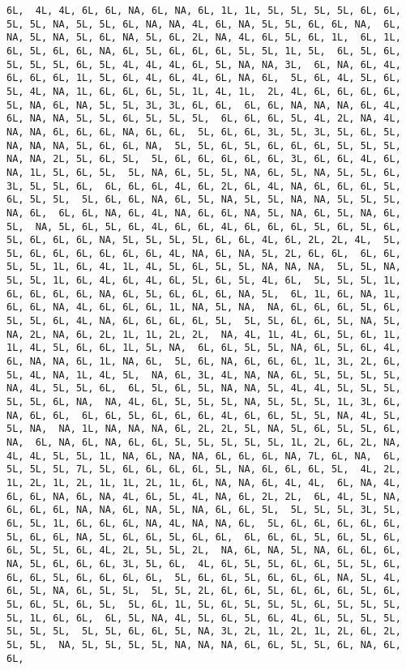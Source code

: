 \documentclass[
]{article}
\begin{document}
\begin{verbatim}
6L,  4L, 4L, 6L, 6L, NA, 6L, NA, 6L, 1L, 1L, 5L, 5L, 5L, 5L, 6L, 6L,  5L, 5L, NA, 5L, 5L, 6L, NA, NA, 4L, 6L, NA, 5L, 5L, 6L, 6L, NA,  6L, NA, 5L, NA, 5L, 6L, NA, 5L, 6L, 2L, NA, 4L, 6L, 5L, 6L, 1L,  6L, 1L, 6L, 5L, 6L, 6L, NA, 6L, 5L, 6L, 6L, 6L, 5L, 5L, 1L, 5L,  6L, 5L, 6L, 5L, 5L, 5L, 6L, 5L, 4L, 4L, 4L, 6L, 5L, NA, NA, 3L,  6L, NA, 6L, 4L, 6L, 6L, 6L, 1L, 5L, 6L, 4L, 6L, 4L, 6L, NA, 6L,  5L, 6L, 4L, 5L, 6L, 5L, 4L, NA, 1L, 6L, 6L, 6L, 5L, 1L, 4L, 1L,  2L, 4L, 6L, 6L, 6L, 6L, 5L, NA, 6L, NA, 5L, 5L, 3L, 3L, 6L, 6L,  6L, 6L, NA, NA, NA, 6L, 4L, 6L, NA, NA, 5L, 5L, 6L, 5L, 5L, 5L,  6L, 6L, 6L, 5L, 4L, 2L, NA, 4L, NA, NA, 6L, 6L, 6L, NA, 6L, 6L,  5L, 6L, 6L, 3L, 5L, 3L, 5L, 6L, 5L, NA, NA, NA, 5L, 6L, 6L, NA,  5L, 5L, 6L, 5L, 6L, 6L, 6L, 5L, 5L, 5L, NA, NA, 2L, 5L, 6L, 5L,  5L, 6L, 6L, 6L, 6L, 6L, 3L, 6L, 6L, 4L, 6L, NA, 1L, 5L, 6L, 5L,  5L, NA, 6L, 5L, 5L, NA, 6L, 5L, NA, 5L, 5L, 6L, 3L, 5L, 5L, 6L,  6L, 6L, 6L, 4L, 6L, 2L, 6L, 4L, NA, 6L, 6L, 6L, 5L, 6L, 5L, 5L,  5L, 6L, 6L, NA, 6L, 5L, NA, 5L, 5L, NA, NA, 5L, 5L, 5L, NA, 6L,  6L, 6L, NA, 6L, 4L, NA, 6L, 6L, NA, 5L, NA, 6L, 5L, NA, 6L, 5L,  NA, 5L, 6L, 5L, 6L, 4L, 6L, 6L, 4L, 6L, 6L, 6L, 5L, 6L, 5L, 6L,  5L, 6L, 6L, 6L, NA, 5L, 5L, 5L, 5L, 6L, 6L, 4L, 6L, 2L, 2L, 4L,  5L, 5L, 6L, 6L, 6L, 6L, 6L, 6L, 4L, NA, 6L, NA, 5L, 2L, 6L, 6L,  6L, 6L, 5L, 5L, 1L, 6L, 4L, 1L, 4L, 5L, 6L, 5L, 5L, NA, NA, NA,  5L, 5L, NA, 5L, 5L, 1L, 6L, 4L, 6L, 4L, 6L, 5L, 6L, 5L, 4L, 6L,  5L, 5L, 5L, 1L, 6L, 6L, 6L, 6L, NA, 6L, 5L, 6L, 6L, 6L, NA, 5L,  6L, 1L, 6L, NA, 1L, 6L, 6L, NA, 4L, 6L, 6L, 6L, 1L, NA, 5L, NA,  NA, 6L, 6L, 6L, 5L, 6L, 5L, 5L, 6L, 4L, NA, 6L, 6L, 6L, 6L, 5L,  5L, 5L, 6L, 6L, 5L, NA, 5L, NA, 2L, NA, 6L, 2L, 1L, 1L, 2L, 2L,  NA, 4L, 1L, 4L, 6L, 5L, 6L, 1L, 1L, 4L, 5L, 6L, 6L, 1L, 5L, NA,  6L, 6L, 5L, 5L, NA, 6L, 5L, 6L, 4L, 6L, NA, NA, 6L, 1L, NA, 6L,  5L, 6L, NA, 6L, 6L, 6L, 1L, 3L, 2L, 6L, 5L, 4L, NA, 1L, 4L, 5L,  NA, 6L, 3L, 4L, NA, NA, 6L, 5L, 5L, 5L, 5L, NA, 4L, 5L, 5L, 6L,  6L, 5L, 6L, 5L, NA, NA, 5L, 4L, 4L, 5L, 5L, 5L, 5L, 5L, 6L, NA,  NA, 4L, 6L, 5L, 5L, 5L, NA, 5L, 5L, 5L, 1L, 3L, 6L, NA, 6L, 6L,  6L, 6L, 5L, 6L, 6L, 6L, 4L, 6L, 6L, 5L, 5L, NA, 4L, 5L, 5L, NA,  NA, 1L, NA, NA, NA, 6L, 2L, 2L, 5L, NA, 5L, 6L, 5L, 5L, 6L, NA,  6L, NA, 6L, NA, 6L, 6L, 5L, 5L, 5L, 5L, 5L, 1L, 2L, 6L, 2L, NA,  4L, 4L, 5L, 5L, 1L, NA, 6L, NA, NA, 6L, 6L, 6L, NA, 7L, 6L, NA,  6L, 5L, 5L, 5L, 7L, 5L, 6L, 6L, 6L, 6L, 5L, NA, 6L, 6L, 6L, 5L,  4L, 2L, 1L, 2L, 1L, 2L, 1L, 1L, 2L, 1L, 6L, NA, NA, 6L, 4L, 4L,  6L, NA, 4L, 6L, 6L, NA, 6L, NA, 4L, 6L, 5L, 4L, NA, 6L, 2L, 2L,  6L, 4L, 5L, NA, 6L, 6L, 6L, NA, NA, 6L, NA, 5L, NA, 6L, 6L, 5L,  5L, 5L, 5L, 3L, 5L, 6L, 5L, 1L, 6L, 6L, 6L, NA, 4L, NA, NA, 6L,  5L, 6L, 6L, 6L, 6L, 6L, 5L, 6L, 6L, NA, 5L, 6L, 6L, 5L, 6L, 6L,  6L, 6L, 6L, 5L, 6L, 5L, 6L, 6L, 5L, 5L, 6L, 4L, 2L, 5L, 5L, 2L,  NA, 6L, NA, 5L, NA, 6L, 6L, 6L, NA, 5L, 6L, 6L, 6L, 3L, 5L, 6L,  4L, 6L, 5L, 5L, 6L, 6L, 5L, 5L, 6L, 6L, 6L, 5L, 6L, 6L, 6L, 6L,  5L, 6L, 6L, 5L, 6L, 6L, 6L, NA, 5L, 4L, 6L, 5L, NA, 6L, 5L, 5L,  5L, 5L, 2L, 6L, 6L, 5L, 6L, 6L, 6L, 5L, 6L, 5L, 6L, 5L, 6L, 5L,  5L, 6L, 1L, 5L, 6L, 5L, 5L, 5L, 6L, 5L, 5L, 5L, 5L, 1L, 6L, 6L,  6L, 5L, NA, 4L, 5L, 6L, 5L, 6L, 4L, 6L, 5L, 5L, 5L, 5L, 5L, 5L,  5L, 5L, 6L, 6L, 5L, NA, 3L, 2L, 1L, 2L, 1L, 2L, 6L, 2L, 5L, 5L,  NA, 5L, 5L, 5L, 5L, NA, NA, NA, 6L, 6L, 5L, 5L, 6L, NA, 6L, 6L, 
\end{verbatim}
\end{document}

